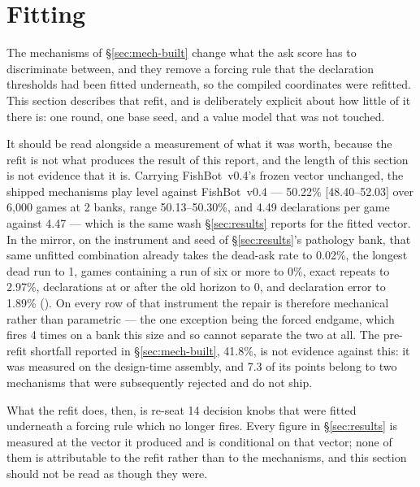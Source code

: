 \documentclass[11pt]{article}
\theoremstyle{definition}
\DeclareRobustCommand{\vfour}{\texorpdfstring{\mbox{FishBot v0.4}}{FishBot v0.4}}
\providecommand{\numVfourParamWin}{41.8}
\providecommand{\numRejectedCost}{7.3}
\providecommand{\numShipParamWin}{50.22}
\providecommand{\numShipParamCI}{48.40--52.03}
\providecommand{\numShipParamRange}{50.13--50.30}
\providecommand{\numShipParamSeeds}{2}
\providecommand{\numShipParamGames}{6{,}000}
\providecommand{\numShipParamDecl}{4.49}
\providecommand{\numShipParamVfourDecl}{4.47}
\providecommand{\numShipParamDeadAsk}{0.02}
\providecommand{\numShipParamDeadRun}{1}
\providecommand{\numShipParamDeadRunGames}{0}
\providecommand{\numShipParamRepeat}{2.97}
\providecommand{\numShipParamDeclWrong}{1.89}
\providecommand{\numShipParamPostHorizon}{0}
\providecommand{\numShipParamForcedN}{4}
\providecommand{\numFitKnobs}{14}
\begin{document}
\section{Fitting}
\label{sec:fitting}

The mechanisms of \S\ref{sec:mech-built} change what the ask score has to
discriminate between, and they remove a forcing rule that the declaration
thresholds had been fitted underneath, so the compiled coordinates were
refitted. This section describes that refit, and is deliberately explicit about
how little of it there is: one round, one base seed, and a value model that was
not touched.

It should be read alongside a measurement of what it was worth, because the
refit is not what produces the result of this report, and the length of this
section is not evidence that it is. Carrying \vfour{}'s frozen
vector unchanged, the shipped mechanisms play level against \vfour{} ---
\numShipParamWin\% [\numShipParamCI] over \numShipParamGames{} games at
\numShipParamSeeds{} banks, range \numShipParamRange\%, and
\numShipParamDecl{} declarations per game against \numShipParamVfourDecl{} ---
which is the same wash \S\ref{sec:results} reports for the fitted vector. In the
mirror, on the instrument and seed of \S\ref{sec:results}'s pathology bank, that
same unfitted combination already takes the dead-ask rate to
\numShipParamDeadAsk\%, the longest dead run to \numShipParamDeadRun{}, games
containing a run of six or more to \numShipParamDeadRunGames\%, exact repeats
to \numShipParamRepeat\%, declarations at or after the old horizon to
\numShipParamPostHorizon{}, and declaration error to
\numShipParamDeclWrong\% ().
On every row of that instrument the repair is therefore mechanical rather than
parametric --- the one exception being the forced endgame, which fires
\numShipParamForcedN{} times on a bank this size and so cannot separate the two
at all. The pre-refit shortfall reported in \S\ref{sec:mech-built},
\numVfourParamWin\%, is not evidence against this: it was measured on the
design-time assembly, and \numRejectedCost{} of its points belong to two
mechanisms that were subsequently rejected and do not ship.

What the refit does, then, is re-seat \numFitKnobs{} decision knobs that were
fitted underneath a forcing rule which no longer fires. Every figure in
\S\ref{sec:results} is measured at the vector it produced and is conditional on
that vector; none of them is attributable to the refit rather than to the
mechanisms, and this section should not be read as though they were.
\end{document}
